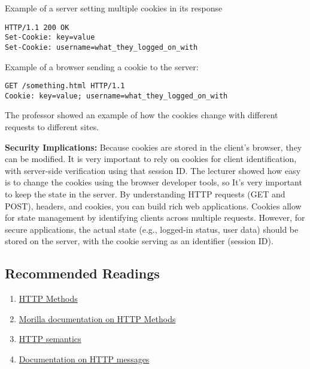 \begin{example} {Example of a server setting multiple cookies in its response}
\begin{lstlisting}
HTTP/1.1 200 OK
Set-Cookie: key=value
Set-Cookie: username=what_they_logged_on_with
\end{lstlisting}
Example of a browser sending a cookie to the server:
\begin{lstlisting}
GET /something.html HTTP/1.1
Cookie: key=value; username=what_they_logged_on_with
\end{lstlisting}
	
\end{example}
The professor showed an example of how the cookies change with different requests to different sites.

\textbf{Security Implications:} Because cookies are stored in the client's browser, they can be modified. It is very important to rely on cookies for client identification, with server-side verification using that session ID. The lecturer showed how easy is to change the cookies using the browser developer tools, so It's very important to keep the state in the server.
By understanding HTTP requests (GET and POST), headers, and cookies, you can build rich web applications. Cookies allow for state management by identifying clients across multiple requests. However, for secure applications, the actual state (e.g., logged-in status, user data) should be stored on the server, with the cookie serving as an identifier (session ID).

\subsection{Recommended Readings}
\begin{enumerate}[label=\roman*), noitemsep]
	\item \href{https://restfulapi.net/http-methods/}{HTTP Methods}
	\item \href{https://developer.mozilla.org/en-US/docs/Web/HTTP/Methods}{Morilla documentation on HTTP Methods}
	\item \href{https://www.rfc-editor.org/rfc/rfc9110.html}{HTTP semantics}
	\item \href{https://developer.mozilla.org/en-US/docs/Web/HTTP/Messages}{Documentation on HTTP messages}
\end{enumerate}

